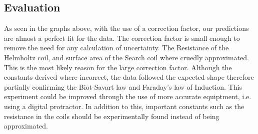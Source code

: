 \subsection{Evaluation}
As seen in the graphs above, with the use of a correction factor, our predictions are almost a perfect fit for the data.
The correction factor is small enough to remove the need for any calculation of uncertainty.
The Resistance of the Helmholtz coil, and surface area of the Search coil where cruedly approximated.
This is the most likely reason for the large correction factor.
Although the constants derived where incorrect, the data followed the expected shape therefore partially confirming the Biot-Savart law and Faraday's law of Induction.
This experiment could be improved through the use of more accurate equiptment, i.e. using a digital protractor.
In addition to this, important constants such as the resistance in the coils should be experimentally found instead of being approximated.